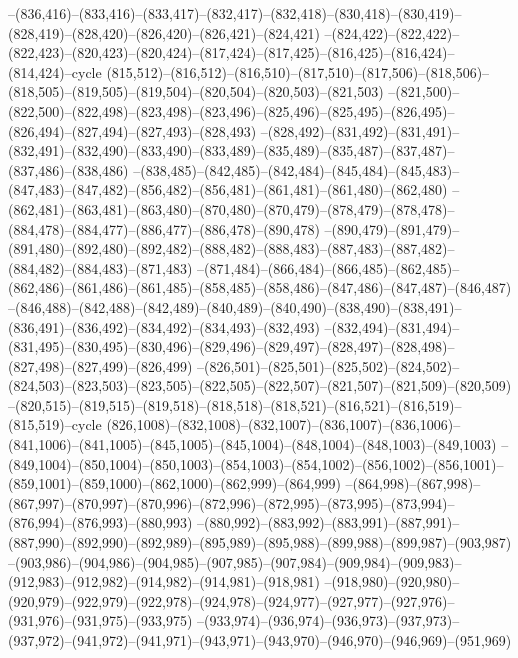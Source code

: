 --(836,416)--(833,416)--(833,417)--(832,417)--(832,418)--(830,418)--(830,419)--(828,419)--(828,420)--(826,420)--(826,421)--(824,421)
--(824,422)--(822,422)--(822,423)--(820,423)--(820,424)--(817,424)--(817,425)--(816,425)--(816,424)--(814,424)--cycle
(815,512)--(816,512)--(816,510)--(817,510)--(817,506)--(818,506)--(818,505)--(819,505)--(819,504)--(820,504)--(820,503)--(821,503)
--(821,500)--(822,500)--(822,498)--(823,498)--(823,496)--(825,496)--(825,495)--(826,495)--(826,494)--(827,494)--(827,493)--(828,493)
--(828,492)--(831,492)--(831,491)--(832,491)--(832,490)--(833,490)--(833,489)--(835,489)--(835,487)--(837,487)--(837,486)--(838,486)
--(838,485)--(842,485)--(842,484)--(845,484)--(845,483)--(847,483)--(847,482)--(856,482)--(856,481)--(861,481)--(861,480)--(862,480)
--(862,481)--(863,481)--(863,480)--(870,480)--(870,479)--(878,479)--(878,478)--(884,478)--(884,477)--(886,477)--(886,478)--(890,478)
--(890,479)--(891,479)--(891,480)--(892,480)--(892,482)--(888,482)--(888,483)--(887,483)--(887,482)--(884,482)--(884,483)--(871,483)
--(871,484)--(866,484)--(866,485)--(862,485)--(862,486)--(861,486)--(861,485)--(858,485)--(858,486)--(847,486)--(847,487)--(846,487)
--(846,488)--(842,488)--(842,489)--(840,489)--(840,490)--(838,490)--(838,491)--(836,491)--(836,492)--(834,492)--(834,493)--(832,493)
--(832,494)--(831,494)--(831,495)--(830,495)--(830,496)--(829,496)--(829,497)--(828,497)--(828,498)--(827,498)--(827,499)--(826,499)
--(826,501)--(825,501)--(825,502)--(824,502)--(824,503)--(823,503)--(823,505)--(822,505)--(822,507)--(821,507)--(821,509)--(820,509)
--(820,515)--(819,515)--(819,518)--(818,518)--(818,521)--(816,521)--(816,519)--(815,519)--cycle
(826,1008)--(832,1008)--(832,1007)--(836,1007)--(836,1006)--(841,1006)--(841,1005)--(845,1005)--(845,1004)--(848,1004)--(848,1003)--(849,1003)
--(849,1004)--(850,1004)--(850,1003)--(854,1003)--(854,1002)--(856,1002)--(856,1001)--(859,1001)--(859,1000)--(862,1000)--(862,999)--(864,999)
--(864,998)--(867,998)--(867,997)--(870,997)--(870,996)--(872,996)--(872,995)--(873,995)--(873,994)--(876,994)--(876,993)--(880,993)
--(880,992)--(883,992)--(883,991)--(887,991)--(887,990)--(892,990)--(892,989)--(895,989)--(895,988)--(899,988)--(899,987)--(903,987)
--(903,986)--(904,986)--(904,985)--(907,985)--(907,984)--(909,984)--(909,983)--(912,983)--(912,982)--(914,982)--(914,981)--(918,981)
--(918,980)--(920,980)--(920,979)--(922,979)--(922,978)--(924,978)--(924,977)--(927,977)--(927,976)--(931,976)--(931,975)--(933,975)
--(933,974)--(936,974)--(936,973)--(937,973)--(937,972)--(941,972)--(941,971)--(943,971)--(943,970)--(946,970)--(946,969)--(951,969)
